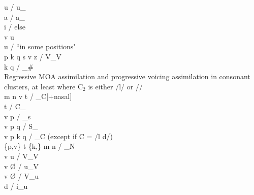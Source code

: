 \documentclass[11pt]{article}
\begin{document}
 \textrightarrow\hspace{0pt} u / u_ \\
 \textrightarrow\hspace{0pt} a / a_ \\
 \textrightarrow\hspace{0pt} i / else \\
v \textrightarrow\hspace{0pt} u\\
 \textrightarrow\hspace{0pt} u / \textquotedblleft in some positions" \\
p k q s \textrightarrow\hspace{0pt} v  z / V_V \\
 \textrightarrow\hspace{0pt} k q / _\# \\
Regressive MOA assimilation and progressive voicing assimilation in consonant clusters, at least where C$_2$ is either /l/ or // \\
m n  \textrightarrow\hspace{0pt} v t  / _C[+nasal] \\
 \textrightarrow\hspace{0pt} t / C_ \\
v \textrightarrow\hspace{0pt} p / _s \\
v  \textrightarrow\hspace{0pt} p q / S_ \\
v  \textrightarrow\hspace{0pt} p k q / _C (except if C = /l d/) \\
\{p,v\} t \{k,\} \textrightarrow\hspace{0pt} m n  / _N \\
v \textrightarrow\hspace{0pt} u / V_V \\
v \textrightarrow\hspace{0pt} \O\hspace{0pt} / u_V \\
v \textrightarrow\hspace{0pt} \O\hspace{0pt} / V_u \\
d \textrightarrow\hspace{0pt}  / i_u \\
\end{document}
